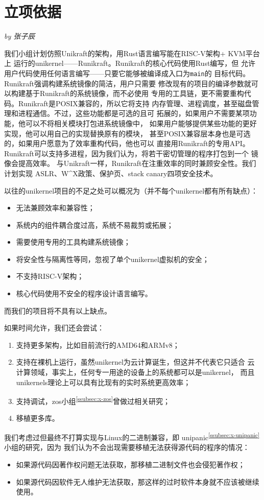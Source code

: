 \documentclass[UTF8,fontset=none,linespread=1.15]{ctexart}
\newcommand{\sectionauthor}[1]{%
\vspace*{-5ex}
\noindent\textrm{\hfill\textit{by #1}}
\vspace*{2ex}\par}
\begin{document}
\section{立项依据}\sectionauthor{张子辰}
我们小组计划仿照Unikraft的架构，用Rust语言编写能在RISC-V架构+ KVM平台上
运行的unikernel——Runikraft。Runikraft的核心代码使用Rust编写，但
允许用户代码使用任何语言编写——只要它能够被编译成入口为\texttt{main}的
目标代码。Runikraft强调构建系统镜像的简洁，用户只需要
修改现有的项目的编译参数就可以构建基于Runikraft的系统镜像，而不必使用
专用的工具链，更不需要重构代码。Runikraft是POSIX兼容的，所以它将支持
内存管理、进程调度，甚至磁盘管理和进程通信。不过，这些功能都是可选的且可
拓展的，如果用户不需要某项功能，他可以不将相关模块打包进系统镜像中，
如果用户能够提供某些功能的更好实现，他可以用自己的实现替换原有的模块，
甚至POSIX兼容层本身也是可选的，如果用户愿意为了效率重构代码，他也可以
直接用Runikraft的专用API。
Runikraft可以支持多进程，因为我们认为，将若干密切管理的程序打包到一个
镜像会提高效率。
与Unikraft一样，Runikraft在注重效率的同时兼顾安全性。我们计划实现
ASLR、W\^{}X政策、保护页、stack canary四项安全技术。

以往的unikernel项目的不足之处可以概况为（并不每个unikernel都有所有缺点）：
\begin{itemize}
\item 无法兼顾效率和兼容性；
\item 系统内的组件耦合度过高，系统不易裁剪或拓展；
\item 需要使用专用的工具构建系统镜像；
\item 将安全性与隔离性等同，忽视了单个unikernel虚拟机的安全；
\item 不支持RISC-V架构；
\item 核心代码使用不安全的程序设计语言编写。
\end{itemize}
而我们的项目将不具有以上缺点。

如果时间允许，我们还会尝试：
\begin{enumerate}
\item 支持更多架构，比如目前流行的AMD64和ARMv8；
\item 支持在裸机上运行，虽然unikernel为云计算诞生，但这并不代表它只适合
    云计算领域，事实上，任何专一用途的设备上的系统都可以是unikernel，
    而且unikernels理论上可以具有比现有的实时系统更高效率；
\item 支持调试，zos小组\textsuperscript{\ref{ssubsec:x-zos}}曾做过相关研究；
\item 移植更多库。
\end{enumerate}

我们考虑过但最终不打算实现与Linux的二进制兼容，即
unipanic\textsuperscript{\ref{ssubsec:x-unipanic}}小组的研究，因为
我们认为不会出现需要移植无法获得源代码的程序的情况：
\begin{itemize}
\item 如果源代码因著作权问题无法获取，那移植二进制文件也会侵犯著作权；
\item 如果源代码因软件无人维护无法获取，那这样的过时软件本身就不应该被继续使用。
\end{itemize}
\end{document}

